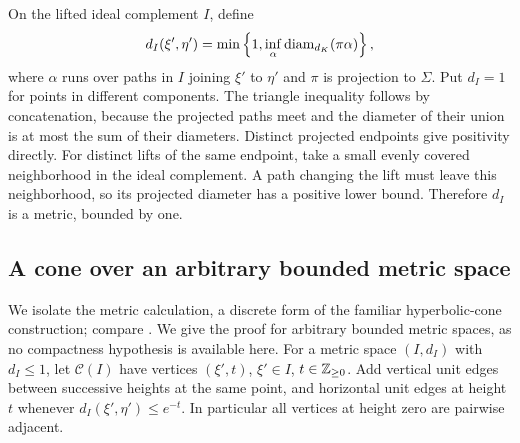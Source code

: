 On the lifted ideal complement $I$, define
\begin{equation}\label{mod:ideal-metric}
 d_I(\xi',\eta')=
 \min\left\{1,\inf_\alpha\operatorname{diam}_{d_K}(\pi\alpha)\right\},
\end{equation}
where $\alpha$ runs over paths in $I$ joining $\xi'$ to $\eta'$
and $\pi$ is projection to $\Sigma$.  Put $d_I=1$ for points in
different components.  The triangle inequality follows by
concatenation, because the projected paths meet and the diameter
of their union is at most the sum of their diameters.  Distinct
projected endpoints give positivity directly.  For distinct lifts
of the same endpoint, take a small evenly covered neighborhood
in the ideal complement.  A path changing the lift must leave
this neighborhood, so its projected diameter has a positive
lower bound.  Therefore $d_I$ is a metric, bounded by one.

\subsection{A cone over an arbitrary bounded metric space}

We isolate the metric calculation, a discrete form of the familiar
hyperbolic-cone construction; compare \cite[Section~7]{BonkSchramm2000}.
We give the proof for arbitrary bounded metric spaces, as no
compactness hypothesis is available here.  For a metric space $(I,d_I)$
with $d_I\le1$, let $\mathcal C(I)$ have vertices $(\xi',t)$,
$\xi'\in I$, $t\in\mathbb Z_{\ge0}$.  Add vertical unit edges between
successive heights at the same point, and horizontal unit edges
at height $t$ whenever $d_I(\xi',\eta')\le e^{-t}$.
In particular all vertices at height zero are pairwise adjacent.


